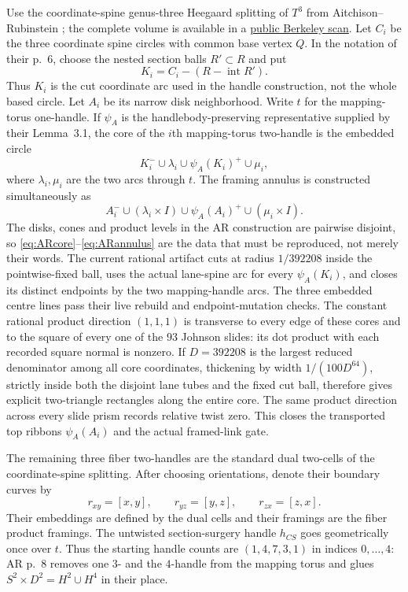 \documentclass[11pt]{amsart}
\theoremstyle{definition}
\theoremstyle{remark}
\begin{document}
Use the coordinate-spine genus-three Heegaard splitting of $T^3$ from
Aitchison--Rubinstein \cite[pp.~5--12]{AitchisonRubinstein1984}; the complete
volume is available in a
\href{https://math.berkeley.edu/~kirby/papers/Gordon%20and%20Kirby%20%28editors%29%20-%20Four-manifold%20theory%20%28Durham%29%20-%20MR0780574.pdf}
{public Berkeley scan}.  Let $C_i$ be the three coordinate spine circles with
common base vertex $Q$.  In the notation of their p.~6, choose the nested
section balls $R'\subset R$ and put
\[
K_i=C_i-(R-\operatorname{int}R').
\]
Thus $K_i$ is the cut coordinate arc used in the handle construction, not the
whole based circle.  Let $A_i$ be its narrow disk neighborhood.
Write $t$ for the mapping-torus one-handle.  If $\psi_A$ is the
handlebody-preserving representative supplied by their Lemma~3.1, the core
of the $i$th mapping-torus two-handle is the embedded circle
\begin{equation}\label{eq:ARcore}
K_i^-\cup\lambda_i\cup\psi_A(K_i)^+\cup\mu_i,
\end{equation}
where $\lambda_i,\mu_i$ are the two arcs through $t$.  The framing annulus is
constructed simultaneously as
\begin{equation}\label{eq:ARannulus}
A_i^-\cup(\lambda_i\times I)\cup\psi_A(A_i)^+
       \cup(\mu_i\times I).
\end{equation}
The disks, cones and product levels in the AR construction are pairwise
disjoint, so \eqref{eq:ARcore}--\eqref{eq:ARannulus} are the data that must be
reproduced, not merely their words.  The current rational artifact cuts at
radius $1/392208$ inside the pointwise-fixed ball, uses the actual lane-spine
arc for every $\psi_A(K_i)$, and closes its distinct endpoints by the two
mapping-handle arcs.  The three embedded centre lines pass their live rebuild
and endpoint-mutation checks.  The constant rational product direction
$(1,1,1)$ is transverse to every edge of these cores and to the square of
every one of the $93$ Johnson slides: its dot product with each recorded
square normal is nonzero.  If $D=392208$ is the largest reduced denominator
among all core coordinates, thickening by width $1/(100D^{64})$, strictly
inside both the disjoint lane tubes and the fixed cut ball, therefore gives
explicit two-triangle rectangles along the entire core.  The same product
direction across every slide prism records relative twist zero.  This closes
the transported top ribbons $\psi_A(A_i)$ and the actual framed-link gate.

The remaining three fiber two-handles are the standard dual two-cells of the
coordinate-spine splitting.  After choosing orientations, denote their
boundary curves by
\[
r_{xy}=[x,y],\qquad r_{yz}=[y,z],\qquad r_{zx}=[z,x].
\]
Their embeddings are defined by the dual cells and their framings are the
fiber product framings.  The untwisted section-surgery handle $h_{CS}$ goes
geometrically once over $t$.  Thus the starting handle counts are
$(1,4,7,3,1)$ in indices $0,\ldots,4$: AR p.~8 removes one $3$- and the
$4$-handle from the mapping torus and glues
$S^2\times D^2=H^2\cup H^4$ in their place.
\end{document}
